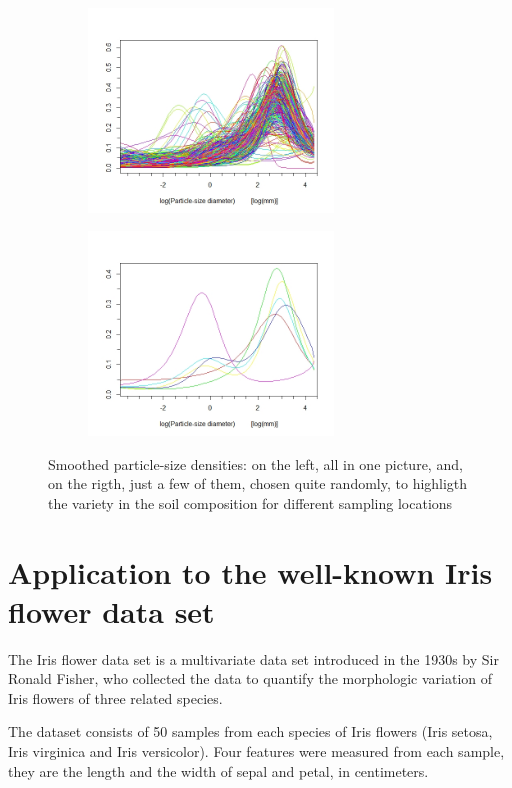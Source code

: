 \begin{figure}[ht]
	
	\begin{subfigure}{.5\textwidth}
		\includegraphics[width=6.5cm]{./pictures/psc/psc_all_res_4.jpeg} 
		\label{fig:subim1}
	\end{subfigure}
	\begin{subfigure}{.5\textwidth}
		\includegraphics[width=6.5cm]{./pictures/psc/psc_few_res_4.jpeg}
		\label{fig:subim2}
	\end{subfigure}
	
	\caption{Smoothed particle-size densities: on the left, all in one picture, and, on the rigth, just a few of them, chosen quite randomly, to highligth the variety in the soil composition for different sampling locations}
	\label{fig:psc_smoothed}
	
\end{figure}

\section{Application to the well-known Iris flower data set}
The Iris flower data set is a multivariate data set introduced in the 1930s by Sir Ronald Fisher, who collected the data to quantify the morphologic variation of Iris flowers of three related species.
 
The dataset consists of 50 samples from each species of Iris flowers (Iris setosa, Iris virginica and Iris versicolor). Four features were measured from each sample, they are the length and the width of sepal and petal, in centimeters. 

